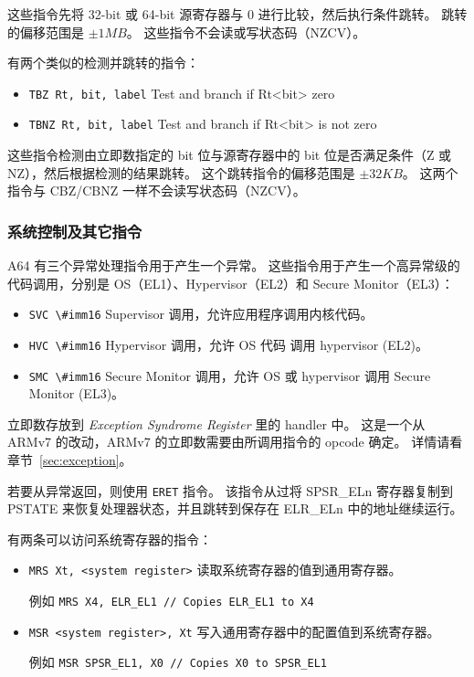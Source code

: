这些指令先将 32-bit 或 64-bit 源寄存器与 0 进行比较，然后执行条件跳转。
跳转的偏移范围是 $\pm1MB$。
这些指令不会读或写状态码（NZCV）。

有两个类似的检测并跳转的指令：

\begin{itemize}
  \item \lstinline!TBZ Rt, bit, label! \quad Test and branch if Rt<bit> zero
  \item \lstinline!TBNZ Rt, bit, label! \quad Test and branch if Rt<bit> is not zero
\end{itemize}

这些指令检测由立即数指定的 bit 位与源寄存器中的 bit 位是否满足条件（Z 或 NZ），然后根据检测的结果跳转。
这个跳转指令的偏移范围是 $\pm32KB$。
这两个指令与 CBZ/CBNZ 一样不会读写状态码（NZCV）。

\subsubsection{系统控制及其它指令}


A64 有三个异常处理指令用于产生一个异常。
这些指令用于产生一个高异常级的代码调用，分别是 OS（EL1）、Hypervisor（EL2）和 Secure Monitor（EL3）：

\begin{itemize}
  \item \lstinline!SVC \#imm16! \quad Supervisor 调用，允许应用程序调用内核代码。
  \item \lstinline!HVC \#imm16! \quad Hypervisor 调用，允许 OS 代码 调用 hypervisor (EL2)。
  \item \lstinline!SMC \#imm16! \quad Secure Monitor 调用，允许 OS 或 hypervisor 调用 Secure Monitor (EL3)。
\end{itemize}

立即数存放到 \textit{Exception Syndrome Register} 里的 handler 中。
这是一个从 ARMv7 的改动，ARMv7 的立即数需要由所调用指令的 opcode 确定。
详情请看章节~\ref{sec:exception}。

若要从异常返回，则使用 \lstinline!ERET! 指令。
该指令从过将 SPSR\_ELn 寄存器复制到 PSTATE 来恢复处理器状态，并且跳转到保存在 ELR\_ELn 中的地址继续运行。


有两条可以访问系统寄存器的指令：
\begin{itemize}
  \item \lstinline!MRS Xt, <system register>! \quad 读取系统寄存器的值到通用寄存器。

    例如 \lstinline!MRS X4, ELR_EL1 // Copies ELR_EL1 to X4!
  \item \lstinline!MSR <system register>, Xt! \quad 写入通用寄存器中的配置值到系统寄存器。

    例如 \lstinline!MSR SPSR_EL1, X0 // Copies X0 to SPSR_EL1!
\end{itemize}

